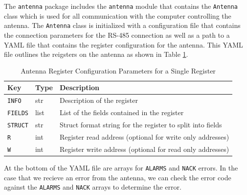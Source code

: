 The \texttt{antenna} package includes the \texttt{antenna} module that contains the \texttt{Antenna} class which is used for all communication with the computer controlling the antenna.
The \texttt{Antenna} class is initialized with a configuration file that contains the connection parameters for the RS-485 connection as well as a path to a YAML file that contains the register configuration for the antenna.
This YAML file outlines the reigsters on the antenna as shown in Table \ref{chap2/table:antenna_regs}.

\begin{table}
    \centering
    \begin{tabularx}{\textwidth}{l|l|X}
        \textbf{Key} & \textbf{Type} & \textbf{Description} \\ \hline    
        \texttt{INFO} & str & Description of the register \\
        \texttt{FIELDS} & list & List of the fields contained in the register \\
        \texttt{STRUCT} & str & Struct format string for the register to split into fields \\
        \texttt{R} & int & Register read address (optional for write only addresses)\\
        \texttt{W} & int & Register write address (optional for read only addresses)\\
    \end{tabularx}
    \label{chap2/table:antenna_regs}
    \caption{Antenna Register Configuration Parameters for a Single Register}
\end{table}

At the bottom of the YAML file are arrays for \texttt{ALARMS} and \texttt{NACK} errors. 
In the case that we recieve an error from the antenna, we can check the error code against the \texttt{ALARMS} and \texttt{NACK} arrays to determine the error.

